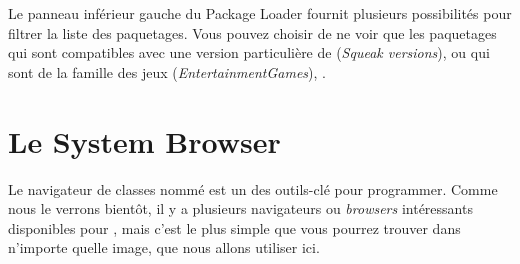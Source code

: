\documentclass[a4paper,10pt,twoside]{book}
\begin{document}


Le panneau inf\'erieur gauche du \sqmap Package Loader fournit
plusieurs possibilit\'es pour filtrer la liste des paquetages. Vous
pouvez choisir de ne voir que les paquetages qui sont compatibles avec
une version particuli\`ere de \sq
(\emph{Squeak versions}), 
ou qui sont de la famille des jeux
(\emph{Entertainment\go{}Games}), 
\etc.

\section{Le System Browser}

Le navigateur de classes nomm\'e  est un des
outils-cl\'e pour programmer.
Comme nous le verrons bient\^ot, il y a plusieurs navigateurs ou
\emph{browsers} int\'eressants disponibles pour \sq, mais c'est le
plus simple que vous pourrez trouver dans n'importe quelle image, que nous allons utiliser ici.

\end{document}
